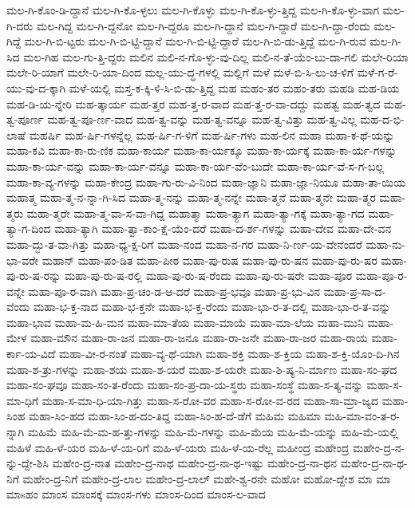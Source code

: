 {ಮಲ-ಗಿ-ಕೊಂ-ಡಿ-ದ್ದಾನೆ
ಮಲ-ಗಿ-ಕೊ-ಳ್ಳಲು
ಮಲ-ಗಿ-ಕೊಳ್ಳು
ಮಲ-ಗಿ-ಕೊ-ಳ್ಳು-ತ್ತಿದ್ದ
ಮಲ-ಗಿ-ಕೊ-ಳ್ಳು-ವಾಗ
ಮಲ-ಗಿ-ದರು
ಮಲ-ಗಿದ್ದ
ಮಲ-ಗಿ-ದ್ದನೋ
ಮಲ-ಗಿ-ದ್ದರೂ
ಮಲ-ಗಿ-ದ್ದಾನೆ
ಮಲ-ಗಿ-ದ್ದಾರೆ
ಮಲ-ಗಿ-ದ್ದಾ-ರೆಂದು
ಮಲ-ಗಿದ್ದೆ
ಮಲ-ಗಿ-ಬಿ-ಟ್ಟರು
ಮಲ-ಗಿ-ಬಿ-ಟ್ಟಿ-ದ್ದಾನೆ
ಮಲ-ಗಿ-ಬಿ-ಟ್ಟಿ-ದ್ದಾರೆ
ಮಲ-ಗಿ-ಬಿ-ಡು-ತ್ತಿದ್ದೆ
ಮಲ-ಗಿ-ರುವ
ಮಲ-ಗಿ-ಸಿದ
ಮಲ-ಗಿಹ
ಮಲ-ಗು-ತ್ತಿ-ದ್ದರು
ಮಲಿನ
ಮಲಿ-ನ-ಗೊ-ಳ್ಳು-ವು-ದಿಲ್ಲ
ಮಲಿ-ನ-ತೆ-ಯೆಂ-ಬು-ದಾ-ಗಲಿ
ಮಲೇ-ರಿಯಾ
ಮಲೇ-ರಿ-ಯಾಗೆ
ಮಲೇ-ರಿ-ಯಾ-ದಿಂದ
ಮಲ್ಲ-ಯು-ದ್ಧ-ಗಳಲ್ಲಿ
ಮಲ್ಲಿಗೆ
ಮಳೆ
ಮಳೆ-ಬಿ-ಸಿ-ಲು-ಚ-ಳಿಗೆ
ಮಳೆ-ಗ-ರೆ-ಯು-ವು-ದ-ಕ್ಕಾಗಿ
ಮಳೆ-ಯಲ್ಲಿ
ಮಸ್ತ-ಕ-ಕ್ಕಿ-ಳಿ-ಸಿ-ಬಿ-ಡು-ತ್ತಿದ್ದ
ಮಹ
ಮಹಂ-ತರ
ಮಹಂ-ತರು
ಮಹಡಿ
ಮಹ-ಡಿಯ
ಮಹ-ಡಿ-ಯ-ನ್ನೇರಿ
ಮಹ-ತ್ಕಾರ್ಯ
ಮಹ-ತ್ತರ
ಮಹ-ತ್ತ-ರ-ವಾದ
ಮಹ-ತ್ತ-ರ-ವಾ-ದದ್ದು
ಮಹತ್ವ
ಮಹ-ತ್ವದ
ಮಹ-ತ್ವ-ಪೂರ್ಣ
ಮಹ-ತ್ವ-ಪೂ-ರ್ಣ-ವಾದ
ಮಹ-ತ್ವ-ವನ್ನು
ಮಹ-ತ್ವ-ವನ್ನೂ
ಮಹ-ತ್ವ-ವಿತ್ತು
ಮಹ-ತ್ವ-ವಿಲ್ಲ
ಮಹ-ದ-ಭಿ-ಲಾಷೆ
ಮಹರ್ಷಿ
ಮಹ-ರ್ಷಿ-ಗಳನ್ನೆಲ್ಲ
ಮಹ-ರ್ಷಿ-ಗ-ಳಿಗೆ
ಮಹ-ರ್ಷಿ-ಗಳು
ಮಹ-ಲಿನ
ಮಹಾ
ಮಹಾ-ಕ-ಥೆ-ಯನ್ನು
ಮಹಾ-ಕವಿ
ಮಹಾ-ಕಾ-ರು-ಣಿಕ
ಮಹಾ-ಕಾರ್ಯ
ಮಹಾ-ಕಾ-ರ್ಯಕ್ಕೂ
ಮಹಾ-ಕಾ-ರ್ಯಕ್ಕೆ
ಮಹಾ-ಕಾ-ರ್ಯ-ಗಳನ್ನು
ಮಹಾ-ಕಾ-ರ್ಯ-ವನ್ನು
ಮಹಾ-ಕಾ-ರ್ಯ-ವನ್ನೂ
ಮಹಾ-ಕಾ-ರ್ಯ-ವೆಂ-ಬುದೇ
ಮಹಾ-ಕಾ-ರ್ಯ-ವೆ-ಸ-ಗ-ಬಲ್ಲ
ಮಹಾ-ಕಾ-ವ್ಯ-ಗಳನ್ನು
ಮಹಾ-ಕೇಂದ್ರ
ಮಹಾ-ಗು-ರು-ವಿ-ನಿಂದ
ಮಹಾ-ಜ್ಞಾನಿ
ಮಹಾ-ಜ್ಞಾ-ನಿಯೂ
ಮಹಾ-ತಾ-ಯಿಯ
ಮಹಾತ್ಮ
ಮಹಾ-ತ್ಮ-ನ-ನ್ನಾ-ಗಿ-ಸಿದ
ಮಹಾ-ತ್ಮ-ನನ್ನು
ಮಹಾ-ತ್ಮ-ನನ್ನೇ
ಮಹಾ-ತ್ಮನೆ
ಮಹಾ-ತ್ಮನೇ
ಮಹಾ-ತ್ಮರ
ಮಹಾ-ತ್ಮರು
ಮಹಾ-ತ್ಮರೇ
ಮಹಾ-ತ್ಮ-ವಾ-ಸ-ವಾ-ಗಿದ್ದ
ಮಹಾತ್ಮಾ
ಮಹಾ-ತ್ಯಾಗ
ಮಹಾ-ತ್ಯಾ-ಗಕ್ಕೆ
ಮಹಾ-ತ್ಯಾ-ಗದ
ಮಹಾ-ತ್ಯಾ-ಗ-ದಿಂದ
ಮಹಾ-ತ್ಯಾಗಿ
ಮಹಾ-ತ್ವಾ-ಕಾಂ-ಕ್ಷೆ-ಯೆಂ-ದರೆ
ಮಹಾ-ದ-ರ್ಶ-ಗಳನ್ನು
ಮಹಾ-ದೇವ
ಮಹಾ-ದೇ-ವನ
ಮಹಾ-ದ್ಭು-ತ-ವಾ-ಗಿತ್ತು
ಮಹಾ-ಧ್ಯ-ಕ್ಷ-ರಿಗೆ
ಮಹಾ-ನಂದ
ಮಹಾ-ನ-ಗರ
ಮಹಾ-ನಿ-ರ್ಣ-ಯ-ವೇನೆಂದರೆ
ಮಹಾ-ನು-ಭಾ-ವರೇ
ಮಹಾನ್
ಮಹಾ-ಪಂ-ಡಿತ
ಮಹಾ-ಪೀಠ
ಮಹಾ-ಪು-ರುಷ
ಮಹಾ-ಪು-ರು-ಷನ
ಮಹಾ-ಪು-ರು-ಷರ
ಮಹಾ-ಪು-ರು-ಷ-ರನ್ನು
ಮಹಾ-ಪು-ರು-ಷ-ರಲ್ಲಿ
ಮಹಾ-ಪು-ರು-ಷ-ರೆಂದು
ಮಹಾ-ಪು-ರು-ಷರೇ
ಮಹಾ-ಪೂರ
ಮಹಾ-ಪೂ-ರ-ವನ್ನೇ
ಮಹಾ-ಪೂ-ರ-ವಾಗಿ
ಮಹಾ-ಪ್ರ-ಚಂ-ಡ-ಆ-ದರೆ
ಮಹಾ-ಪ್ರ-ಭವೂ
ಮಹಾ-ಪ್ರ-ಭು-ವಿನ
ಮಹಾ-ಪ್ರ-ಸಾ-ದ-ವೆಂದು
ಮಹಾ-ಭ-ಕ್ತ-ನಾದ
ಮಹಾ-ಭ-ಕ್ತನೇ
ಮಹಾ-ಭ-ಕ್ತ-ರೆಂದು
ಮಹಾ-ಭಾ-ರ-ತ-ದಲ್ಲಿ
ಮಹಾ-ಭಾ-ರ-ತ-ವನ್ನು
ಮಹಾ-ಭಾವ
ಮಹಾ-ಮ-ಹಿ-ಮನ
ಮಹಾ-ಮಾ-ತೆಯ
ಮಹಾ-ಮಾಯೆ
ಮಹಾ-ಮಾ-ಲೆಯ
ಮಹಾ-ಮುನಿ
ಮಹಾ-ಮೇಳ
ಮಹಾ-ಮೌನ
ಮಹಾ-ರಾ-ಜನ
ಮಹಾ-ರಾ-ಜನೂ
ಮಹಾ-ರಾ-ಜನೇ
ಮಹಾ-ರಾ-ಜರ
ಮಹಾ-ರಾಯ
ಮಹಾ-ರ್ಕಾ-ಯ-ವಿದೆ
ಮಹಾ-ವೀ-ರ-ನಂತೆ
ಮಹಾ-ವ್ಯ-ಥೆ-ಯಾಗಿ
ಮಹಾ-ಶಕ್ತಿ
ಮಹಾ-ಶ-ಕ್ತಿಯ
ಮಹಾ-ಶ-ಕ್ತಿ-ಯೊಂ-ದಿ-ಗಿನ
ಮಹಾ-ಶ-ತ್ರು-ಗಳನ್ನು
ಮಹಾ-ಶಯ
ಮಹಾ-ಶ-ಯರೆ
ಮಹಾ-ಶ-ಯರೇ
ಮಹಾ-ಶಿ-ಷ್ಯ-ನಿ-ರ್ಮಾಣ
ಮಹಾ-ಸಂ-ಘದ
ಮಹಾ-ಸಂ-ಘವೂ
ಮಹಾ-ಸಂ-ತ-ರೆಂದು
ಮಹಾ-ಸಂ-ಪ್ರ-ದಾ-ಯ-ಸ್ಥರು
ಮಹಾ-ಸಂಸ್ಥೆ
ಮಹಾ-ಸ-ತ್ಯ-ವನ್ನು
ಮಹಾ-ಸ-ಮಾ-ಧಿಗೆ
ಮಹಾ-ಸ-ಮಾ-ಧಿ-ಯಾ-ಗಿತ್ತು
ಮಹಾ-ಸ-ರೋ-ವರ
ಮಹಾ-ಸ-ರೋ-ವ-ರದ
ಮಹಾ-ಸಾ-ಮ್ರಾ-ಜ್ಯದ
ಮಹಾ-ಸಿಂಹ
ಮಹಾ-ಸಿಂ-ಹದ
ಮಹಾ-ಸಿಂ-ಹ-ದಂ-ತಿದ್ದ
ಮಹಾ-ಸಿಂ-ಹ-ದೆ-ಡೆಗೆ
ಮಹಿಮ
ಮಹಿಮಾ
ಮಹಿ-ಮಾ-ವಂ-ತ-ರ-ನ್ನಾಗಿ
ಮಹಿಮೆ
ಮಹಿ-ಮೆ-ಮ-ಹ-ತ್ತು-ಗಳನ್ನು
ಮಹಿ-ಮೆ-ಗಳನ್ನು
ಮಹಿ-ಮೆಯ
ಮಹಿ-ಮೆ-ಯನ್ನು
ಮಹಿ-ಮೆ-ಯಲ್ಲಿ
ಮಹಿಳೆ
ಮಹಿ-ಳೆ-ಯರ
ಮಹಿ-ಳೆ-ಯ-ರಿಗೆ
ಮಹಿ-ಳೆ-ಯರು
ಮಹಿ-ಳೆ-ಯ-ರೆಲ್ಲ
ಮಹೀಂದ್ರ
ಮಹೇಂದ್ರ
ಮಹೇಂ-ದ್ರ-ನ-ನ್ನು-ದ್ದೇ-ಶಿಸಿ
ಮಹೇಂ-ದ್ರ-ನಾತ
ಮಹೇಂ-ದ್ರ-ನಾಥ
ಮಹೇಂ-ದ್ರ-ನಾ-ಥ-ಇಷ್ಟು
ಮಹೇಂ-ದ್ರ-ನಾ-ಥನ
ಮಹೇಂ-ದ್ರ-ನಾ-ಥ-ನಿಗೆ
ಮಹೇಂ-ದ್ರ-ನಿಗೆ
ಮಹೇಂ-ದ್ರ-ಲಾಲ
ಮಹೇಂ-ದ್ರ-ಲಾಲ್
ಮಹೇ-ಶ್ವ-ರನೇ
ಮಹೋ
ಮಹೋ-ದ್ದೇಶ
ಮಾ
ಮಾ
ಮಾsಹಂ
ಮಾಂಸ
ಮಾಂಸಕ್ಕೆ
ಮಾಂಸ-ಗಳು
ಮಾಂಸ-ದಿಂದ
ಮಾಂಸ-ಲ-ವಾದ
}
